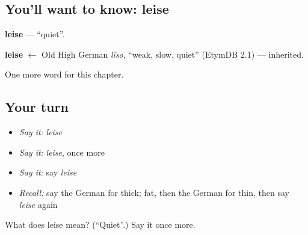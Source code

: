 \subsection*{You'll want to know: leise}
\textbf{leise} — \textquotedblleft{}quiet\textquotedblright{}.

\begin{cousinweb}
\textbf{leise} $\leftarrow$ Old High German \emph{līso}, \textquotedblleft{}weak, slow, quiet\textquotedblright{} (EtymDB 2.1) — inherited.
\end{cousinweb}

\begin{grammarlens}[title={What you've built}]
One more word for this chapter.
\end{grammarlens}

\subsection*{Your turn}
\begin{itemize}
\raggedright
  \item \emph{Say it:} \emph{leise}
  \item \emph{Say it:} \emph{leise}, once more
  \item \emph{Say it:} say \emph{leise}
  \item \emph{Recall:} say the German for thick; fat, then the German for thin, then say \emph{leise} again
\end{itemize}

\begin{tcolorbox}[breakable,colback=teal!4,colframe=teal!35!black,title={Before you move on}]
What does leise mean? (\textquotedblleft{}Quiet\textquotedblright{}.) Say it once more.
\end{tcolorbox}
